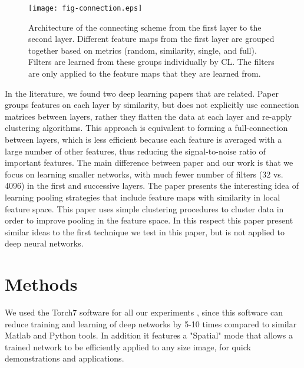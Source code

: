 \documentclass{article} %
\begin{document}
\begin{figure}
\texttt{[image: fig-connection.eps]}
\caption{Architecture of the connecting scheme from the first layer to the second layer. Different feature maps from the first layer are grouped together based on metrics (random, similarity, single, and full). Filters are learned from these groups individually by CL. The filters are only applied to the feature maps that they are learned from.}
\label{fig-learnlayers}
\end{figure}

In the literature, we found two deep learning papers that are related. 
Paper \cite{coates2012learning} groups features on each layer by similarity, but does not explicitly use connection matrices between layers, rather they flatten the data at each layer and re-apply clustering algorithms. This approach is equivalent to forming a full-connection between layers, which is less efficient because each feature is averaged with a large number of other features, thus reducing the signal-to-noise ratio of important features. The main difference between paper \cite{coates2012learning} and our work is that we focus on learning smaller networks, with much fewer number of filters (32 vs. 4096) in the first and successive layers. 
The paper \cite{boureau_2011} presents the interesting idea of learning pooling strategies that include feature maps with similarity in local feature space. This paper uses simple clustering procedures to cluster data in order to improve pooling in the feature space. In this respect this paper present similar ideas to the first technique we test in this paper, but is not applied to deep neural networks.



\section{Methods}
\label{sec-methods}


We used the Torch7 software for all our experiments \cite{collobert_torch7_2011}, since this software can reduce training and learning of deep networks by 5-10 times compared to similar Matlab and Python tools. In addition it features a "Spatial" mode that allows a trained network to be efficiently applied to any size image, for quick demonstrations and applications.
\end{document}
